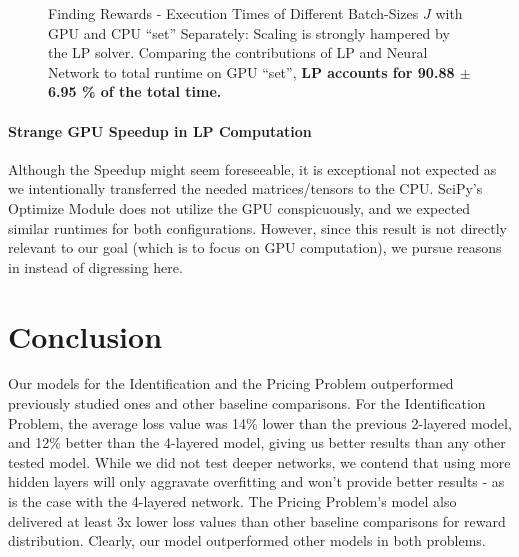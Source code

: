 \documentclass[12pt]{article}
\begin{document}
\begin{figure}[!htbp]
\begin{subfigure}{.49\textwidth}
            \label{fig:Finding Rewards - Time taken by the Neural Network}
        \end{subfigure}
        \vspace*{1em}
        \caption[Finding Rewards - Execution Times of Different Batch-Sizes $J$ with GPU and CPU ``set'' Separately]{Finding Rewards - Execution Times of Different Batch-Sizes $J$ with GPU and CPU ``set'' Separately: Scaling is strongly hampered by the LP solver. Comparing the contributions of LP and Neural Network to total runtime on GPU ``set'', \textbf{LP accounts for 90.88 $\pm$ 6.95 \% of the total time.}}
        \label{fig:Finding Rewards - Execution Times of Different Batch-Sizes J with GPU and CPU ``set'' Separately}
    \end{figure}

    \paragraph{Strange GPU Speedup in LP Computation}
    Although the Speedup might seem foreseeable, it is exceptional not expected as we intentionally transferred the needed matrices/tensors to the CPU. SciPy's Optimize Module does not utilize the GPU conspicuously, and we expected similar runtimes for both configurations. However, since this result is not directly relevant to our goal (which is to focus on GPU computation), we pursue reasons in  instead of digressing here.
    
    \section{Conclusion} \label{sec:Conclusion}
    Our models for the Identification and the Pricing Problem outperformed previously studied ones \cite{Xue2016Avi2} and other baseline comparisons. For the Identification Problem, the average loss value was 14\% lower than the previous 2-layered model, and 12\% better than the 4-layered model, giving us better results than any other tested model. While we did not test deeper networks, we contend that using more hidden layers will only aggravate overfitting and won't provide better results - as is the case with the 4-layered network. The Pricing Problem's model also delivered at least 3x lower loss values than other baseline comparisons for reward distribution. Clearly, our model outperformed other models in both problems.
    
\end{document}
